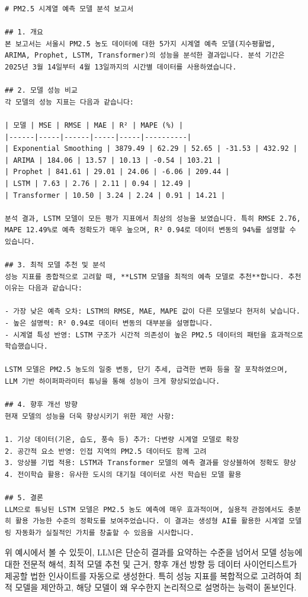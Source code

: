 \documentclass[12pt,ko,a4,]{report}
\begin{document}
\begin{lstlisting}
# PM2.5 시계열 예측 모델 분석 보고서

## 1. 개요
본 보고서는 서울시 PM2.5 농도 데이터에 대한 5가지 시계열 예측 모델(지수평활법, ARIMA, Prophet, LSTM, Transformer)의 성능을 분석한 결과입니다. 분석 기간은 2025년 3월 14일부터 4월 13일까지의 시간별 데이터를 사용하였습니다.

## 2. 모델 성능 비교
각 모델의 성능 지표는 다음과 같습니다:

| 모델 | MSE | RMSE | MAE | R² | MAPE (%) |
|------|-----|------|-----|-----|----------|
| Exponential Smoothing | 3879.49 | 62.29 | 52.65 | -31.53 | 432.92 |
| ARIMA | 184.06 | 13.57 | 10.13 | -0.54 | 103.21 |
| Prophet | 841.61 | 29.01 | 24.06 | -6.06 | 209.44 |
| LSTM | 7.63 | 2.76 | 2.11 | 0.94 | 12.49 |
| Transformer | 10.50 | 3.24 | 2.24 | 0.91 | 14.21 |

분석 결과, LSTM 모델이 모든 평가 지표에서 최상의 성능을 보였습니다. 특히 RMSE 2.76, MAPE 12.49%로 예측 정확도가 매우 높으며, R² 0.94로 데이터 변동의 94%를 설명할 수 있습니다.

## 3. 최적 모델 추천 및 분석
성능 지표를 종합적으로 고려할 때, **LSTM 모델을 최적의 예측 모델로 추천**합니다. 추천 이유는 다음과 같습니다:

- 가장 낮은 예측 오차: LSTM의 RMSE, MAE, MAPE 값이 다른 모델보다 현저히 낮습니다.
- 높은 설명력: R² 0.94로 데이터 변동의 대부분을 설명합니다.
- 시계열 특성 반영: LSTM 구조가 시간적 의존성이 높은 PM2.5 데이터의 패턴을 효과적으로 학습했습니다.

LSTM 모델은 PM2.5 농도의 일중 변동, 단기 추세, 급격한 변화 등을 잘 포착하였으며, LLM 기반 하이퍼파라미터 튜닝을 통해 성능이 크게 향상되었습니다.

## 4. 향후 개선 방향
현재 모델의 성능을 더욱 향상시키기 위한 제안 사항:

1. 기상 데이터(기온, 습도, 풍속 등) 추가: 다변량 시계열 모델로 확장
2. 공간적 요소 반영: 인접 지역의 PM2.5 데이터도 함께 고려
3. 앙상블 기법 적용: LSTM과 Transformer 모델의 예측 결과를 앙상블하여 정확도 향상
4. 전이학습 활용: 유사한 도시의 대기질 데이터로 사전 학습된 모델 활용

## 5. 결론
LLM으로 튜닝된 LSTM 모델은 PM2.5 농도 예측에 매우 효과적이며, 실용적 관점에서도 충분히 활용 가능한 수준의 정확도를 보여주었습니다. 이 결과는 생성형 AI를 활용한 시계열 모델링 자동화가 실질적인 가치를 창출할 수 있음을 시사합니다.
\end{lstlisting}

위 예시에서 볼 수 있듯이, LLM은 단순히 결과를 요약하는 수준을 넘어서
모델 성능에 대한 전문적 해석, 최적 모델 추천 및 근거, 향후 개선 방향 등
데이터 사이언티스트가 제공할 법한 인사이트를 자동으로 생성한다. 특히
성능 지표를 복합적으로 고려하여 최적 모델을 제안하고, 해당 모델이 왜
우수한지 논리적으로 설명하는 능력이 돋보인다.
\end{document}

